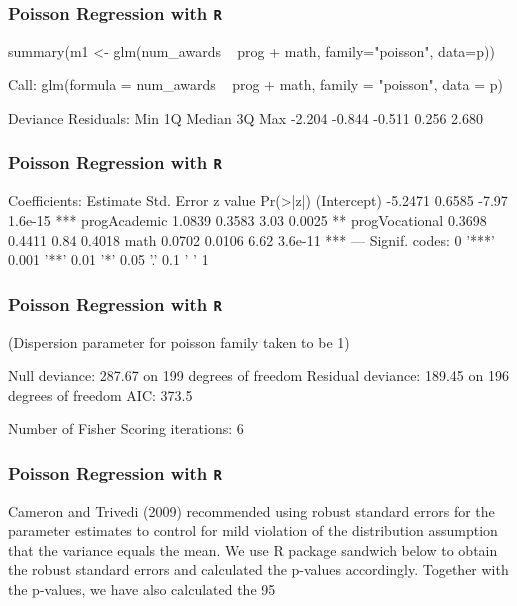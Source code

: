 \begin{frame}[fragile]

\frametitle{Poisson Regression with \texttt{R}}
\Large

summary(m1 <- glm(num_awards ~ prog + math, family="poisson", data=p))
 
 
 Call:
 glm(formula = num_awards ~ prog + math, family = "poisson", data = p)
 
 Deviance Residuals: 
    Min      1Q  Median      3Q     Max  
 -2.204  -0.844  -0.511   0.256   2.680  
 

\end{frame}

\begin{frame}[fragile]

\frametitle{Poisson Regression with \texttt{R}}
\Large


 Coefficients:
                Estimate Std. Error z value Pr(>|z|)    
 (Intercept)     -5.2471     0.6585   -7.97  1.6e-15 ***
 progAcademic     1.0839     0.3583    3.03   0.0025 ** 
 progVocational   0.3698     0.4411    0.84   0.4018    
 math             0.0702     0.0106    6.62  3.6e-11 ***
 ---
 Signif. codes:  0 '***' 0.001 '**' 0.01 '*' 0.05 '.' 0.1 ' ' 1
 

\end{frame}

\begin{frame}[fragile]

\frametitle{Poisson Regression with \texttt{R}}
\Large


 (Dispersion parameter for poisson family taken to be 1)
 
     Null deviance: 287.67  on 199  degrees of freedom
 Residual deviance: 189.45  on 196  degrees of freedom
 AIC: 373.5
 
 Number of Fisher Scoring iterations: 6
\end{frame}

\begin{frame}[fragile]

\frametitle{Poisson Regression with \texttt{R}}
\Large 
Cameron and Trivedi (2009) recommended using robust standard errors for the parameter estimates to control for mild violation of the distribution assumption that the variance equals the mean. We use R package sandwich below to obtain the robust standard errors and calculated the p-values accordingly. Together with the p-values, we have also calculated the 95%

\end{frame}

